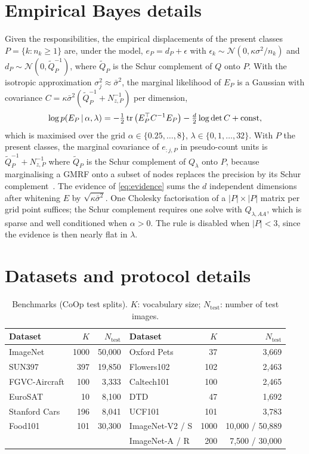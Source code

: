 \section{Empirical Bayes details}
Given the responsibilities, the empirical displacements of the present classes $P=\{k: n_k\ge 1\}$ are, under the model, $e_P = d_P + \epsilon$ with $\epsilon_k\sim\mathcal{N}(0,\kappa\sigma^2/n_k)$ and $d_P\sim\mathcal{N}(0,\tilde{Q}_P^{-1})$, where $\tilde{Q}_P$ is the Schur complement of $Q$ onto $P$. With the isotropic approximation $\sigma_j^2\approx\bar\sigma^2$, the marginal likelihood of $E_P$ is a Gaussian with covariance $C=\kappa\bar\sigma^2(\tilde{Q}_P^{-1}+N_{z,P}^{-1})$ per dimension,
\begin{equation}
  \log p(E_P\,|\,\alpha,\lambda) = -\tfrac{1}{2}\operatorname{tr}\big(E_P^{\top}C^{-1}E_P\big) - \tfrac{d}{2}\log\det C + \mathrm{const},
  \label{eq:evidence}
\end{equation}
which is maximised over the grid $\alpha\in\{0.25,\dots,8\}$, $\lambda\in\{0,1,\dots,32\}$.
With $P$ the present classes, the marginal covariance of $e_{:j,P}$ in pseudo-count units is $\tilde{Q}_P^{-1} + N_{z,P}^{-1}$ where $\tilde{Q}_P$ is the Schur complement of $Q_\lambda$ onto $P$, because marginalising a GMRF onto a subset of nodes replaces the precision by its Schur complement~\cite{rue2005gmrf}. The evidence of \cref{eq:evidence} sums the $d$ independent dimensions after whitening $E$ by $\sqrt{\kappa\bar\sigma^2}$. One Cholesky factorisation of a $|P|\times|P|$ matrix per grid point suffices; the Schur complement requires one solve with $Q_{\lambda,AA}$, which is sparse and well conditioned when $\alpha>0$. The rule is disabled when $|P|<3$, since the evidence is then nearly flat in $\lambda$.

\section{Datasets and protocol details}

\begin{table}[h]
  \centering\footnotesize
  \caption{Benchmarks (CoOp test splits). $K$: vocabulary size; $N_{\mathrm{test}}$: number of test images.}
  \label{tab:datasets}
  \setlength{\tabcolsep}{3pt}
  \begin{tabular}{lrr@{\hskip 8pt}lrr}
    \toprule
    Dataset & $K$ & $N_{\mathrm{test}}$ & Dataset & $K$ & $N_{\mathrm{test}}$\\
    \midrule
    ImageNet & 1000 & 50,000 & Oxford Pets & 37 & 3,669\\
    SUN397 & 397 & 19,850 & Flowers102 & 102 & 2,463\\
    FGVC-Aircraft & 100 & 3,333 & Caltech101 & 100 & 2,465\\
    EuroSAT & 10 & 8,100 & DTD & 47 & 1,692\\
    Stanford Cars & 196 & 8,041 & UCF101 & 101 & 3,783\\
    Food101 & 101 & 30,300 & ImageNet-V2 / S & 1000 & 10,000 / 50,889\\
     & & & ImageNet-A / R & 200 & 7,500 / 30,000\\
    \bottomrule
  \end{tabular}
\end{table}

